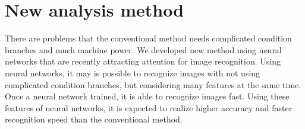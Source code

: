 \documentclass{jps-cp}
\begin{document}
\section{New analysis method}
There are problems that the conventional method needs complicated condition branches and much machine power.
We developed new method using neural networks that are recently attracting attention for image recognition.
Using neural networks, it may is possible to recognize images with not using complicated condition branches,
but considering many features at the same time.
Once a neural network trained, it is able to recognize images fast.
Using these features of neural networks, it is expected to realize higher accuracy and
faster recognition speed than the conventional method.

\end{document}
